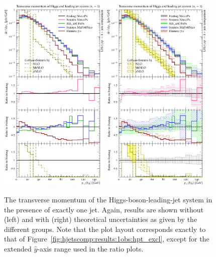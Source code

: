 \begin{figure}[t!]
  \centering
  \includegraphics[width=0.47\textwidth]{figures/hjetscomp_u_Hj_pT_excl.pdf}
  \hfill
  \includegraphics[width=0.47\textwidth]{figures/hjetscomp_Hj_pT_excl.pdf}
  \caption{\label{fig:hjetscomp:results:1obs:hj_pt_excl}%
    The transverse momentum of the Higgs-boson-leading-jet system in
    the presence of exactly one jet. Again, results are shown without
    (left) and with (right) theoretical uncertainties as given by the
    different groups. Note that the plot layout corresponds exactly to
    that of Figure~\ref{fig:hjetscomp:results:1obs:hpt_excl}, except
    for the extended $\hat y$-axis range used in the ratio plots.}
\end{figure}

